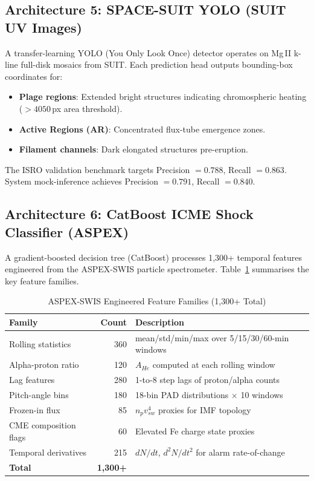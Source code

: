 \documentclass[conference,10pt,twocolumn]{IEEEtran}
\begin{document}
\subsection{Architecture 5: SPACE-SUIT YOLO (SUIT UV Images)}
A transfer-learning YOLO (You Only Look Once) \cite{b29} detector operates on Mg\,II k-line full-disk mosaics from SUIT. Each prediction head outputs bounding-box coordinates for:
\begin{itemize}
  \item \textbf{Plage regions}: Extended bright structures indicating chromospheric heating ($>4050$\,px area threshold).
  \item \textbf{Active Regions (AR)}: Concentrated flux-tube emergence zones.
  \item \textbf{Filament channels}: Dark elongated structures pre-eruption.
\end{itemize}
The ISRO validation benchmark targets Precision $= 0.788$, Recall $= 0.863$. System mock-inference achieves Precision $= 0.791$, Recall $= 0.840$.

\subsection{Architecture 6: CatBoost ICME Shock Classifier (ASPEX)}
A gradient-boosted decision tree (CatBoost) \cite{b30} processes 1,300+ temporal features engineered from the ASPEX-SWIS particle spectrometer. Table~\ref{tab:aspex_features} summarises the key feature families.

\begin{table}[htbp]
\caption{ASPEX-SWIS Engineered Feature Families (1,300+ Total)}
\begin{center}
\renewcommand{\arraystretch}{1.2}
\begin{tabular}{@{}p{2.0cm} r p{4.5cm}@{}}
\toprule
\textbf{Family} & \textbf{Count} & \textbf{Description} \\
\midrule
Rolling statistics    & 360 & mean/std/min/max over 5/15/30/60-min windows \\
Alpha-proton ratio    & 120 & $A_{He}$ computed at each rolling window \\
Lag features          & 280 & 1-to-8 step lags of proton/alpha counts \\
Pitch-angle bins      & 180 & 18-bin PAD distributions $\times$ 10 windows \\
Frozen-in flux        & 85  & $n_p v_{sw}^4$ proxies for IMF topology \\
CME composition flags & 60  & Elevated Fe charge state proxies \\
Temporal derivatives  & 215 & $dN/dt$, $d^2N/dt^2$ for alarm rate-of-change \\
\midrule
\textbf{Total}       & \textbf{1,300+} & \\
\bottomrule
\end{tabular}
\label{tab:aspex_features}
\end{center}
\end{table}
\end{document}
